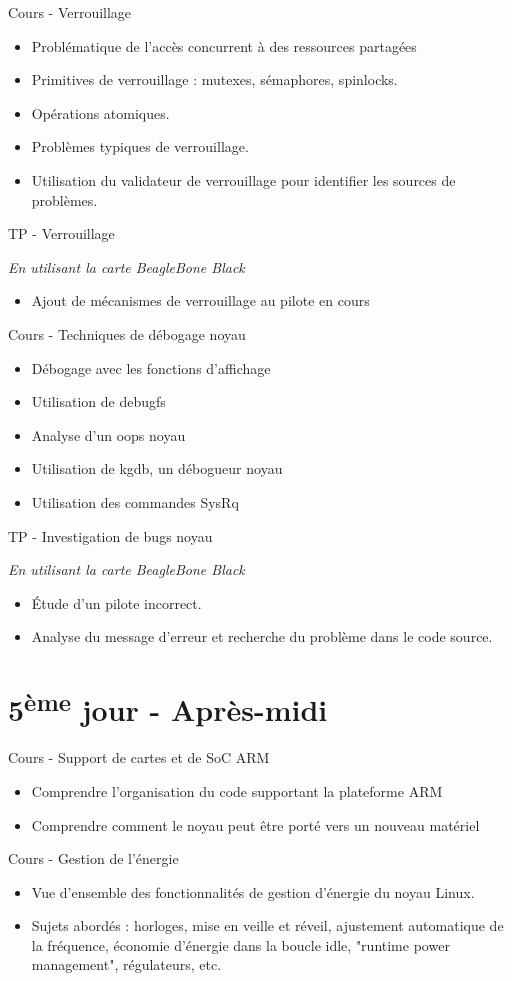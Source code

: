 \documentclass[a4paper,12pt,obeyspaces,spaces,hyphens]{article}
\begin{document}
\feagendatwocolumn
{Cours - Verrouillage}
{
  \begin{itemize}
  \item Problématique de l'accès concurrent à des ressources partagées
  \item Primitives de verrouillage : mutexes, sémaphores, spinlocks.
  \item Opérations atomiques.
  \item Problèmes typiques de verrouillage.
  \item Utilisation du validateur de verrouillage pour identifier les
    sources de problèmes.
  \end{itemize}
}
{TP - Verrouillage}
{
  {\em En utilisant la carte BeagleBone Black}
  \begin{itemize}
  \item Ajout de mécanismes de verrouillage au pilote en cours
  \end{itemize}
}

\feagendatwocolumn
{Cours - Techniques de débogage noyau}
{
  \begin{itemize}
  \item Débogage avec les fonctions d'affichage
  \item Utilisation de debugfs
  \item Analyse d'un oops noyau
  \item Utilisation de kgdb, un débogueur noyau
  \item Utilisation des commandes SysRq
  \end{itemize}
}
{TP - Investigation de bugs noyau}
{
  {\em En utilisant la carte BeagleBone Black}
  \begin{itemize}
  \item Étude d'un pilote incorrect.
  \item Analyse du message d'erreur et recherche du problème dans le code
    source.
  \end{itemize}
}

\section{5\textsuperscript{ème} jour - Après-midi}

\feagendatwocolumn
{Cours - Support de cartes et de SoC ARM}
{
  \begin{itemize}
  \item Comprendre l'organisation du code supportant la plateforme ARM
  \item Comprendre comment le noyau peut être porté vers un nouveau
    matériel
  \end{itemize}
}
{Cours - Gestion de l'énergie}
{
  \begin{itemize}
  \item Vue d'ensemble des fonctionnalités de gestion d'énergie du noyau
    Linux.
  \item Sujets abordés : horloges, mise en veille et réveil, ajustement
    automatique de la fréquence, économie d'énergie dans la boucle idle,
    "runtime power management", régulateurs, etc.
  \end{itemize}
}
\end{document}

